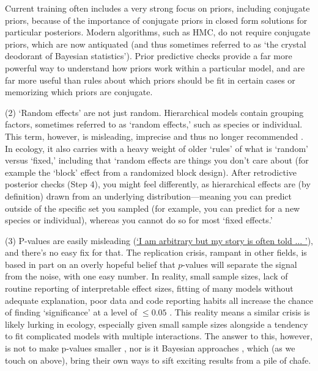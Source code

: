 \documentclass[11pt]{article}
\begin{document}
{Current training often includes a very strong focus on priors, including conjugate priors, because of the importance of conjugate priors in closed form solutions for particular posteriors. Modern algorithms, such as HMC, do not require conjugate priors, which are now antiquated (and thus sometimes referred to as  `the crystal deodorant of Bayesian statistics'). Prior predictive checks provide a far more powerful way to understand how priors work within a particular model, and are far more useful than rules about which priors should be fit in certain cases or memorizing which priors are conjugate. 

(2) `Random effects' are not just random. Hierarchical models contain grouping factors, sometimes referred to as `random effects,' such as species or individual. This term, however, is misleading, imprecise and thus no longer recommended \citep{gelmanhill}. In ecology, it also carries with a heavy weight of older `rules' of what is `random' versus `fixed,' including that `random effects are things you don't care about (for example the `block' effect from a randomized block design). After retrodictive posterior checks (Step 4), you might feel differently, as hierarchical effects are (by definition) drawn from an underlying distribution---meaning you can predict outside of the specific set you sampled (for example, you can predict for a new species or individual), whereas you cannot do so for most `fixed effects.'  %

(3) P-values are easily misleading (\href{https://www.youtube.com/watch?v=c3hxhv0lpI0}{`I am arbitrary but my story is often told ... '}), and there's no easy fix for that. The replication crisis, rampant in other fields, is based in part on an overly hopeful belief that $p$-values will separate the signal from the noise, with one easy number. In reality, small sample sizes, lack of routine reporting of interpretable effect sizes, fitting of many models without adequate explanation, poor data and code reporting habits all increase the chance of finding `significance' at a level of $\le0.05$ \citep{halsey2015,loken2017}. This reality means a similar crisis is likely lurking in ecology, especially given small sample sizes alongside a tendency to fit complicated models with multiple interactions. The answer to this, however, is not to make p-values smaller \citep{halsey2015,colquhoun2017}, nor is it Bayesian approaches , which (as we touch on above), bring their own ways to sift exciting results from a pile of chafe. 

}
\end{document}
